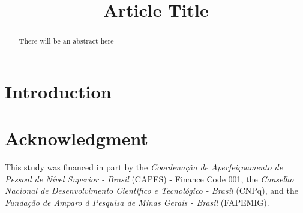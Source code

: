 \documentclass[conference]{IEEEtran}
\begin{document}
\title{Article Title}


\author{
\and
{}
}


\maketitle

\begin{abstract}
There will be an abstract here
\end{abstract}



\IEEEpeerreviewmaketitle

\section{Introduction} \label{sec:intro}

\section*{Acknowledgment}
This study was financed in part by the \emph{Coordenação de Aperfeiçoamento de Pessoal de Nível Superior - Brasil} (CAPES) - Finance Code 001, the \emph{Conselho Nacional de Desenvolvimento Científico e Tecnológico - Brasil} (CNPq), and the \emph{Fundação de Amparo à Pesquisa de Minas Gerais - Brasil} (FAPEMIG).



\end{document}
